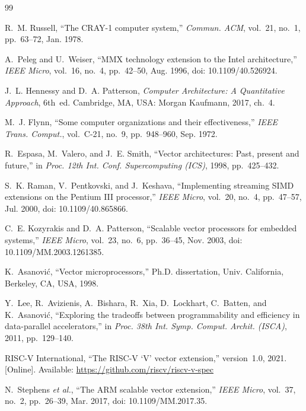 \documentclass[journal]{IEEEtran}
\begin{document}
\begin{thebibliography}{99}

 R.~M. Russell, ``The CRAY-1 computer system,''
\emph{Commun. ACM}, vol.~21, no.~1, pp.~63--72, Jan. 1978.

 A.~Peleg and U.~Weiser, ``MMX technology extension to the Intel
architecture,'' \emph{IEEE Micro}, vol.~16, no.~4, pp.~42--50, Aug. 1996,
doi: 10.1109/40.526924.

 J.~L. Hennessy and D.~A. Patterson, \emph{Computer Architecture: A
Quantitative Approach}, 6th~ed. Cambridge, MA, USA: Morgan Kaufmann, 2017, ch.~4.

 M.~J. Flynn, ``Some computer organizations and their effectiveness,''
\emph{IEEE Trans. Comput.}, vol.~C-21, no.~9, pp.~948--960, Sep. 1972.

 R.~Espasa, M.~Valero, and J.~E. Smith, ``Vector architectures:
Past, present and future,'' in \emph{Proc. 12th Int. Conf. Supercomputing (ICS)},
1998, pp.~425--432.

 S.~K. Raman, V.~Pentkovski, and J.~Keshava, ``Implementing streaming
SIMD extensions on the Pentium III processor,'' \emph{IEEE Micro}, vol.~20, no.~4,
pp.~47--57, Jul. 2000, doi: 10.1109/40.865866.

 C.~E. Kozyrakis and D.~A. Patterson, ``Scalable vector processors
for embedded systems,'' \emph{IEEE Micro}, vol.~23, no.~6, pp.~36--45, Nov. 2003,
doi: 10.1109/MM.2003.1261385.

 K.~Asanovi\'c, ``Vector microprocessors,'' Ph.D. dissertation,
Univ. California, Berkeley, CA, USA, 1998.

 Y.~Lee, R.~Avizienis, A.~Bishara, R.~Xia, D.~Lockhart, C.~Batten,
and K.~Asanovi\'c, ``Exploring the tradeoffs between programmability and efficiency
in data-parallel accelerators,'' in \emph{Proc. 38th Int. Symp. Comput. Archit.
(ISCA)}, 2011, pp.~129--140.

 RISC-V International, ``The RISC-V `V' vector extension,''
version~1.0, 2021. [Online]. Available: \url{https://github.com/riscv/riscv-v-spec}

 N.~Stephens \emph{et al.}, ``The ARM scalable vector extension,''
\emph{IEEE Micro}, vol.~37, no.~2, pp.~26--39, Mar. 2017, doi: 10.1109/MM.2017.35.


\end{thebibliography}
\end{document}
